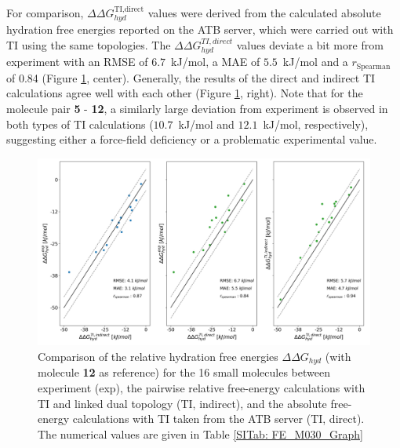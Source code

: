 \FloatBarrier
\clearpage
For comparison, $\Delta \Delta G_{hyd}^\text{TI,direct}$ values were derived from the calculated absolute hydration free energies reported on the ATB server,\cite{Stroet2018} which were carried out with TI using the same topologies. The $\Delta \Delta G_{hyd}^{TI,direct}$ values deviate a bit more from experiment with an RMSE of $6.7$~kJ/mol, a MAE of $5.5$~kJ/mol and a $r_{\text{Spearman}}$ of 0.84 (Figure \ref{fig: pairCorr}, center).
Generally, the results of the direct\cite{Stroet2018} and indirect TI calculations agree well with each other (Figure \ref{fig: pairCorr}, right). Note that for the molecule pair \textbf{5} - \textbf{12}, a similarly large deviation from experiment is observed in both types of TI calculations ($10.7$~kJ/mol and $12.1$~kJ/mol, respectively), suggesting either a force-field deficiency or a problematic experimental value.

\begin{figure}[h!]
    \centering
    \includegraphics[width=\textwidth]{fig/results/pairwise/FE/M030_graph_ddG_solv_correlation_ATB_TI.png}
    \caption{Comparison of the relative hydration free energies $\Delta \Delta G_{hyd}$ (with molecule \textbf{12} as reference) for the 16 small molecules between experiment (exp), the pairwise relative free-energy calculations with TI and linked dual topology (TI, indirect), and the absolute free-energy calculations with TI taken from the ATB server\cite{Stroet2018} (TI, direct). The numerical values are given in Table \ref{SITab: FE_M030_Graph}} 
    \label{fig: pairCorr}
\end{figure}


